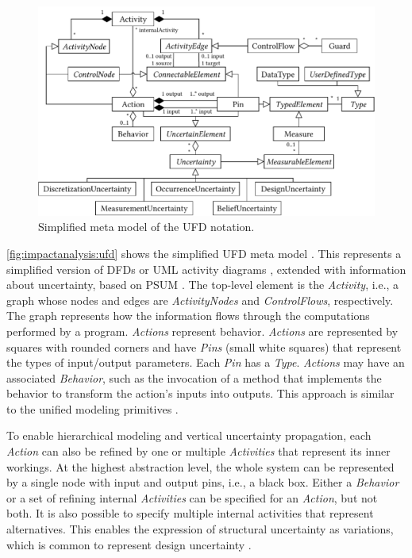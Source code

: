 \begin{figure}
    \centering
    \includegraphics[width=\linewidth]{figures/chapter6/ufd.pdf}
    \caption{Simplified meta model of the \acf*{UFD} notation.}
    \label{fig:impactanalysis:ufd}
\end{figure}

\autoref{fig:impactanalysis:ufd} shows the simplified \ac{UFD} meta model \cite{camara_uncertainty_2024}.
This represents a simplified version of \acp{DFD} \cite{demarco_structure_1979} or \ac{UML} activity diagrams \cite{object_management_group_unified_2015}, extended with information about uncertainty, based on \ac{PSUM} \cite{PSUM}.
The top-level element is the \emph{Activity}, i.e., a graph whose nodes and edges are \emph{ActivityNodes} and \emph{ControlFlows}, respectively. 
The graph represents how the information flows through the computations performed by a program. 
\emph{Actions} represent behavior. 
\emph{Actions} are represented by squares with rounded corners and have \emph{Pins} (small white squares) that represent the types of input/output parameters. Each \emph{Pin} has a \emph{Type}.
\emph{Actions} may have an associated \emph{Behavior}, such as the invocation of a method that implements the behavior to transform the action's inputs into outputs.
This approach is similar to the unified modeling primitives \cite{seifermann_unified_2021}.

To enable hierarchical modeling and vertical uncertainty propagation, each \emph{Action} can also be refined by one or multiple \emph{Activities} that represent its inner workings. 
At the highest abstraction level, the whole system can be represented by a single node with input and output pins, i.e., a black box.
Either a \emph{Behavior} or a set of refining internal \emph{Activities} can be specified for an \emph{Action}, but not both.
It is also possible to specify multiple internal activities that represent alternatives.
This enables the expression of structural uncertainty as variations, which is common to represent design uncertainty \cite{troya_uncertainty_2021}.

